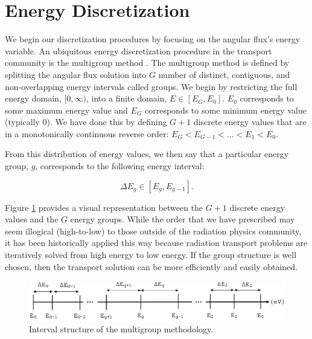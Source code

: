 \section{Energy Discretization}
\label{sec::Sn_MG}

We begin our discretization procedures by focusing on the angular flux's energy variable. An ubiquitous energy discretization procedure in the transport community is the multigroup method \cite{duderstadt1976nuclear,lewis1984computational}. The multigroup method is defined by splitting the angular flux solution into $G$ number of distinct, contiguous, and non-overlapping energy intervals called groups. We begin by restricting the full energy domain, $[0, \infty)$, into a finite domain, $E \in [E_G, E_0]$. $E_0$ corresponds to some maximum energy value and $E_G$ corresponds to some minimum energy value (typically 0). We have done this by defining $G+1$ discrete energy values that are in a monotonically continuous reverse order: $E_G < E_{G-1} <  \ldots < E_1 < E_0$. 

From this distribution of energy values, we then say that a particular energy group, $g$, corresponds to the following energy interval:

\begin{equation}
\label{eq::Sn_MG_energy_interval}
\Delta E_g \in [E_g, E_{g-1}].
\end{equation}

\noindent Figure \ref{fig::Sn_MG_energy_bands} provides a visual representation between the $G+1$ discrete energy values and the $G$ energy groups. While the order that we have prescribed may seem illogical (high-to-low) to those outside of the radiation physics community, it has been historically applied this way because radiation transport problems are iteratively solved from high energy to low energy. If the group structure is well chosen, then the transport solution can be more efficiently and easily obtained.

\begin{figure}[bht]
\centering
\includegraphics[width=1.00\textwidth]{figures/sec_Sn/MG_Energy_Bands.eps}
\caption{Interval structure of the multigroup methodology.}
\label{fig::Sn_MG_energy_bands}
\end{figure}

